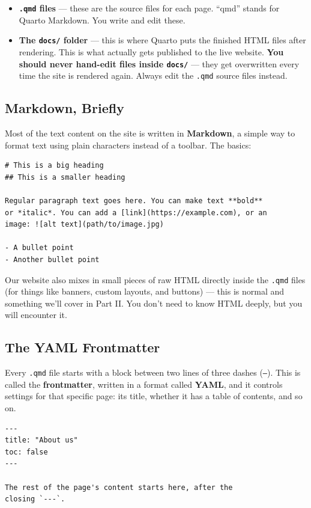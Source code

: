 \documentclass[11pt]{article}
\newcommand{\term}[1]{\textbf{#1}}
\newcommand{\file}[1]{\texttt{#1}}
\newcommand{\cmd}[1]{\texttt{#1}}
\begin{document}
\begin{itemize}
    \item \term{\file{.qmd} files} --- these are the source files for each
    page. ``qmd'' stands for Quarto Markdown. You write and edit these.
    \item \term{The \file{docs/} folder} --- this is where Quarto puts the
    finished HTML files after rendering. This is what actually gets
    published to the live website. \textbf{You should never hand-edit
    files inside \file{docs/}} --- they get overwritten every time the site
    is rendered again. Always edit the \file{.qmd} source files instead.
\end{itemize}

\subsection{Markdown, Briefly}

Most of the text content on the site is written in \term{Markdown}, a
simple way to format text using plain characters instead of a toolbar.
The basics:

\begin{lstlisting}
# This is a big heading
## This is a smaller heading

Regular paragraph text goes here. You can make text **bold**
or *italic*. You can add a [link](https://example.com), or an
image: ![alt text](path/to/image.jpg)

- A bullet point
- Another bullet point
\end{lstlisting}

Our website also mixes in small pieces of raw HTML directly inside the
\file{.qmd} files (for things like banners, custom layouts, and buttons)
--- this is normal and something we'll cover in Part II. You don't need to
know HTML deeply, but you will encounter it.

\subsection{The YAML Frontmatter}

Every \file{.qmd} file starts with a block between two lines of three
dashes (\cmd{---}). This is called the \term{frontmatter}, written in a
format called \term{YAML}, and it controls settings for that specific
page: its title, whether it has a table of contents, and so on.

\begin{lstlisting}
---
title: "About us"
toc: false
---

The rest of the page's content starts here, after the
closing `---`.
\end{lstlisting}
\end{document}

